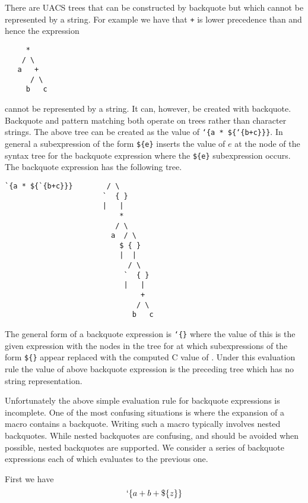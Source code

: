 \documentclass{article}
\begin{document}
There are UACS trees that can be constructed by backquote but which cannot be represented by a string.  For example we have that {\tt +} is lower precedence than {\tt *} and hence the expression
\begin{verbatim}
     *
    / \
   a   +
      / \
     b   c
\end{verbatim}
cannot be represented by a string. It can, however, be created with backquote. Backquote and pattern matching both operate on trees rather than character strings.
The above tree can be created as the value of {\tt `\{a * \$\{`\{b+c\}\}\}}.  In general a subexpression of the form {\tt \$\{e\}} inserts the value of
$e$ at the node of the syntax tree for the backquote expression where the {\tt \$\{e\}} subexpression occurs.  The backquote expression has the following tree.

\begin{verbatim}
`{a * ${`{b+c}}}        / \
                       `  { }
                       |   |
                           *
                          / \
                         a  / \
                           $ { }
                           |  |
                             / \
                            `  { }
                            |   |
                                +
                               / \
                              b   c
\end{verbatim}

The general form of a backquote expression is {\tt `\{<exp1>\}} where the value of this is the given expression {\tt <exp1>} with the nodes
in the tree for {\tt <exp1>} at which subexpressions
of the form {\tt \$\{<exp2>\}} appear replaced with the computed C value of {\tt <exp2>}.  Under this evaluation rule the value of above backquote expression is the preceding tree
which has no string representation.

Unfortunately the above simple evaluation rule for backquote expressions is incomplete.  One of the most
confusing situations is where the expansion of a macro contains a backquote.  Writing such a macro typically involves nested backquotes.  While nested backquotes
are confusing, and should be avoided when possible, nested backquotes are supported.  We consider a series of backquote expressions each of which evaluates to the previous one.

First we have
\begin{equation}
\label{bq1}
`\{a+b+\$\{z\}\}
\end{equation}
\end{document}
